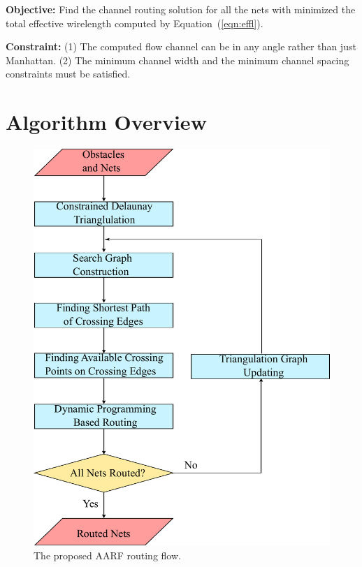 \documentclass[journal]{IEEEtran}
\begin{document}
\textbf{Objective:}
Find the channel routing solution for all the nets with minimized the total effective wirelength computed by Equation~(\ref{eqn:effl}).

\textbf{Constraint:}
(1) The computed flow channel can be in any angle rather than just Manhattan. (2) The minimum channel width and the minimum channel spacing constraints must be satisfied.

\section{Algorithm Overview}
\label{sec:overview}

\begin{figure}
\label{fig:overview}
\centering
\includegraphics[width=0.9\columnwidth, angle=0]{./Figs/newFlowOpt.pdf}
\vspace{-0.2cm}
\caption{The proposed AARF routing flow.}
\label{fig:overview}
\end{figure}
\end{document}
